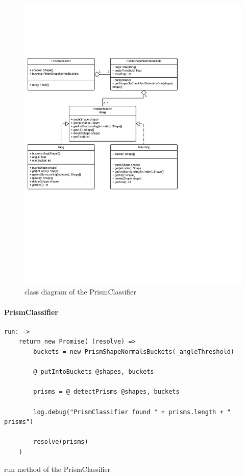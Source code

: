\documentclass[../ClassicThesis.tex]{subfiles}
\begin{document}
\begin{figure}
\includegraphics[width=1.0\columnwidth]{Images/04-prismClassifier.png}
\caption{class diagram of the PrismClassifier}
\label{fig:prismClassifierDiagram}
\end{figure}

\paragraph{PrismClassifier}

\begin{listing}[!h]
\centering
\begin{verbatim}
run: ->
    return new Promise( (resolve) =>
        buckets = new PrismShapeNormalsBuckets(_angleThreshold)

        @_putIntoBuckets @shapes, buckets

        prisms = @_detectPrisms @shapes, buckets

        log.debug("PrismClassifier found " + prisms.length + " prisms")

        resolve(prisms)
    )
\end{verbatim}
\caption{run method of the PrismClassifier}
\label{lst:PrismClassifierRun}
\end{listing}
\end{document}
